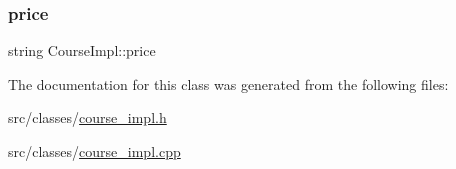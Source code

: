 \subsubsection{\texorpdfstring{price}{price}}
{\footnotesize\ttfamily string Course\+Impl\+::price\hspace{0.3cm}{\ttfamily [protected]}}



The documentation for this class was generated from the following files\+:\begin{DoxyCompactItemize}
\item 
src/classes/\hyperlink{course__impl_8h}{course\+\_\+impl.\+h}\item 
src/classes/\hyperlink{course__impl_8cpp}{course\+\_\+impl.\+cpp}\end{DoxyCompactItemize}
